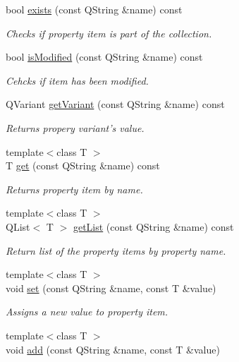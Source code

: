 \begin{DoxyCompactItemize}
bool \hyperlink{classProperties_affd1124bf0ea0712a110e99204b55ea2}{exists} (const Q\-String \&name) const 
\begin{DoxyCompactList}\small\item\em Checks if property item is part of the collection. \end{DoxyCompactList}\item 
bool \hyperlink{classProperties_a8dec2d75af8e2871a089eb49c24227c6}{is\-Modified} (const Q\-String \&name) const 
\begin{DoxyCompactList}\small\item\em Cehcks if item has been modified. \end{DoxyCompactList}\item 
Q\-Variant \hyperlink{classProperties_ac987644f72837c216e73c67dbe931e2b}{get\-Variant} (const Q\-String \&name) const 
\begin{DoxyCompactList}\small\item\em Returns propery variant's value. \end{DoxyCompactList}\item 
{\footnotesize template$<$class T $>$ }\\T \hyperlink{classProperties_a4821665cdb6ab25eb9ce4a4681ba0f3c}{get} (const Q\-String \&name) const 
\begin{DoxyCompactList}\small\item\em Returns property item by name. \end{DoxyCompactList}\item 
{\footnotesize template$<$class T $>$ }\\Q\-List$<$ T $>$ \hyperlink{classProperties_a6bc91c0049e2b7b5f87220ad34186eaa}{get\-List} (const Q\-String \&name) const 
\begin{DoxyCompactList}\small\item\em Return list of the property items by property name. \end{DoxyCompactList}\item 
{\footnotesize template$<$class T $>$ }\\void \hyperlink{classProperties_add6b87d7b0d66ef5dd0a9b2d419cae7f}{set} (const Q\-String \&name, const T \&value)
\begin{DoxyCompactList}\small\item\em Assigns a new value to property item. \end{DoxyCompactList}\item 
{\footnotesize template$<$class T $>$ }\\void \hyperlink{classProperties_a695bdfbe49a5a8301dd960076a5ab375}{add} (const Q\-String \&name, const T \&value)

\end{DoxyCompactItemize}

